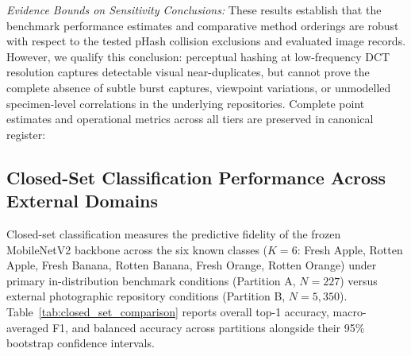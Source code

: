 \noindent \textit{Evidence Bounds on Sensitivity Conclusions:} These results establish that the benchmark performance estimates and comparative method orderings are robust with respect to the tested pHash collision exclusions and evaluated image records. However, we qualify this conclusion: perceptual hashing at low-frequency DCT resolution captures detectable visual near-duplicates, but cannot prove the complete absence of subtle burst captures, viewpoint variations, or unmodelled specimen-level correlations in the underlying repositories. Complete point estimates and operational metrics across all tiers are preserved in canonical register: 

\vspace*{-4pt}\subsection{Closed-Set Classification Performance Across External Domains}
\label{sec:results_closed_set}

Closed-set classification measures the predictive fidelity of the frozen MobileNetV2 backbone across the six known classes ($K = 6$: Fresh Apple, Rotten Apple, Fresh Banana, Rotten Banana, Fresh Orange, Rotten Orange) under primary in-distribution benchmark conditions (Partition A, $N = 227$) versus external photographic repository conditions (Partition B, $N = 5,350$). Table~\ref{tab:closed_set_comparison} reports overall top-1 accuracy, macro-averaged F1, and balanced accuracy across partitions alongside their 95\% bootstrap confidence intervals.


